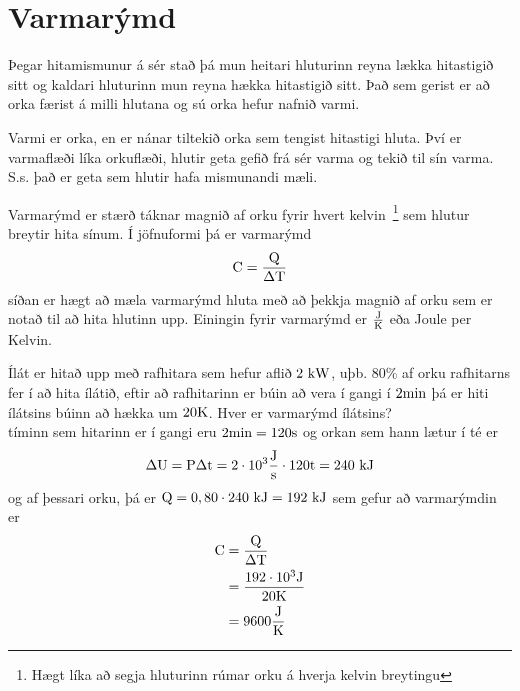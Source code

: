 \chapter{Varmarýmd}
Þegar hitamismunur á sér stað þá mun heitari hluturinn reyna lækka hitastigið
sitt og kaldari hluturinn mun reyna hækka hitastigið sitt. Það sem gerist er
að orka færist á milli hlutana og sú orka hefur nafnið varmi.

Varmi er orka, en er nánar tiltekið orka sem tengist hitastigi hluta. Því er
varmaflæði líka orkuflæði, hlutir geta gefið frá sér varma og tekið til
sín varma. S.s. það er geta sem hlutir hafa mismunandi mæli.

Varmarýmd er stærð táknar magnið af orku fyrir hvert kelvin~\footnote{Hægt 
líka að segja hluturinn rúmar orku á hverja kelvin breytingu} 
sem hlutur breytir hita sínum. Í jöfnuformi þá er varmarýmd
\begin{equation}
	\text{C} = \frac{\text{Q}}{\Delta \text{T}}
\end{equation}
síðan er hægt að mæla varmarýmd hluta með að þekkja magnið af orku sem er notað
til að hita hlutinn upp. Einingin fyrir varmarýmd er $\frac{\textrm{J}}{\text{K}}$ eða
Joule per Kelvin.

\begin{formalexample}
Ílát er hitað upp með rafhitara sem hefur aflið $2 \textrm{ k}\textrm{W}$, uþb. $80\%$ af
orku rafhitarns fer í að hita ílátið, eftir að rafhitarinn er búin að vera
í gangi í $2 \text{min}$ þá er hiti ílátsins búinn að hækka um $20 \text{K}$.
Hver er varmarýmd ílátsins?
\\[4 ex]
tíminn sem hitarinn er í gangi eru $2 \text{min} = 120 \textrm{s}$ og orkan sem hann lætur
í té er
\[
	\Delta\textrm{U} = \textrm{P} \Delta\textrm{t} 
		= 2 \cdot 10^{3} \frac{\textrm{J}}{\textrm{s}} \cdot 120 \textrm{t}
		= 240 \textrm{ k}\textrm{J}
\]
og af þessari orku, þá er $\text{Q} = 0,80 \cdot 240 \textrm{ k}\textrm{J} 
= 192 \textrm{ k}\textrm{J}$ sem gefur að varmarýmdin er
\begin{align*}
	\text{C} &= \frac{\text{Q}}{\Delta \text{T}} \\
		&= \frac{192 \cdot 10^{3} \textrm{J}}{20 \text{K}} \\
		&= 9600 \frac{\textrm{J}}{\text{K}} 
\end{align*}
\end{formalexample}

